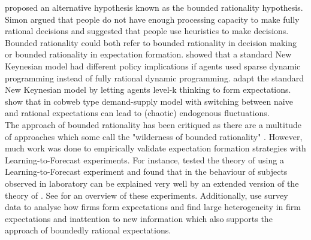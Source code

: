 \cite{simon_models_1957} proposed an alternative hypothesis known as the bounded rationality hypothesis. Simon argued that people do not have enough processing capacity to make fully rational decisions and suggested that people use heuristics to make decisions. Bounded rationality could both refer to bounded rationality in decision making or bounded rationality in expectation formation. \cite{gabaix_behavioral_2020} showed that a standard New Keynesian model had different policy implications if agents used sparse dynamic programming instead of fully rational dynamic programming. \cite{farhi_monetary_2017} adapt the standard New Keynesian model by letting agents level-k thinking to form expectations. \cite{brock_rational_1997} show that in cobweb type demand-supply model with switching between naive and rational expectations can lead to (chaotic) endogenous fluctuations. \\

The approach of bounded rationality has been critiqued as there are a multitude of approaches which some call the "wilderness of bounded rationality" \citep{sims_macroeconomics_1980}. However, much work was done to empirically validate expectation formation strategies with Learning-to-Forecast experiments. For instance, \cite{anufriev_evolutionary_2012} tested the theory of \cite{brock_rational_1997} using a Learning-to-Forecast experiment and found that in the behaviour of subjects observed in laboratory can be explained very well by an extended version of the theory of \cite{brock_rational_1997}. See \cite{hommes_behavioral_2021} for an overview of these experiments. Additionally, \cite{coibion_how_2018} use survey data to analyse how firms form expectations and find large heterogeneity in firm expectations and inattention to new information which also supports the approach of boundedly rational expectations.

